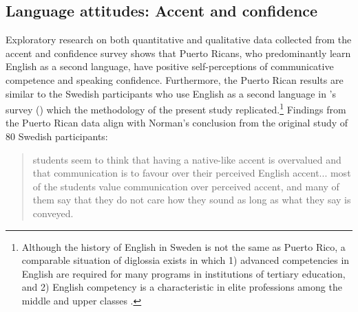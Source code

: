 \documentclass[output=paper,colorlinks,citecolor=brown]{langscibook}
\begin{document}
\subsection{Language attitudes: Accent and confidence}

Exploratory research on both quantitative and qualitative data collected from the accent and confidence survey shows that Puerto Ricans, who predominantly learn English as a second language, have positive self-perceptions of communicative competence and speaking confidence. Furthermore, the Puerto Rican results are similar to the Swedish participants who use English as a second language in \citeauthor{Norman_2017}’s survey (\citeyear{Norman_2017}) which the methodology of the present study replicated.\footnote{Although the history of English in Sweden is not the same as Puerto Rico, a comparable situation of diglossia exists in which 1) advanced competencies in English are required for many programs in institutions of tertiary education, and 2) English competency is a characteristic in elite professions among the middle and upper classes \citep{Berg2001}.} Findings from the Puerto Rican data align with Norman’s conclusion from the original study of 80 Swedish participants:

\begin{quote}
    students seem to think that having a native-like accent is overvalued and that communication is to favour over their perceived English accent... most of the students value communication over perceived accent, and many of them say that they do not care how they sound as long as what they say is conveyed. \citep[ii]{Norman_2017} 
\end{quote}
\end{document}
